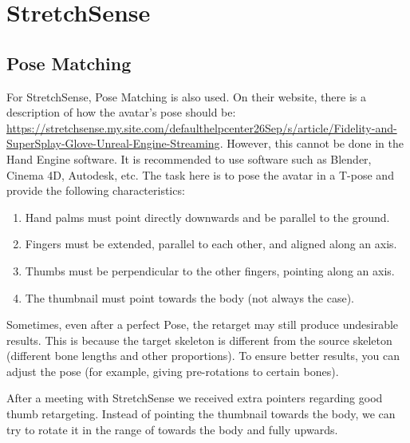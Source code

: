 \documentclass{uva-inf-article}
\begin{document}
\section{StretchSense}
\subsection{Pose Matching}
For StretchSense, Pose Matching is also used. On their website, there is a description of how the avatar's pose should be: \url{https://stretchsense.my.site.com/defaulthelpcenter26Sep/s/article/Fidelity-and-SuperSplay-Glove-Unreal-Engine-Streaming}. However, this cannot be done in the Hand Engine software. It is recommended to use software such as Blender, Cinema 4D, Autodesk, etc. The task here is to pose the avatar in a T-pose and provide the following characteristics:
\begin{enumerate}
    \item Hand palms must point directly downwards and be parallel to the ground.
    \item Fingers must be extended, parallel to each other, and aligned along an axis.
    \item Thumbs must be perpendicular to the other fingers, pointing along an axis.
    \item The thumbnail must point towards the body (not always the case).
\end{enumerate}

Sometimes, even after a perfect Pose, the retarget may still produce undesirable results. This is because the target skeleton is different from the source skeleton (different bone lengths and other proportions). To ensure better results, you can adjust the pose (for example, giving pre-rotations to certain bones).

After a meeting with StretchSense we received extra pointers regarding good thumb retargeting. Instead of pointing the thumbnail towards the body, we can try to rotate it in the range of towards the body and fully upwards.
\end{document}
